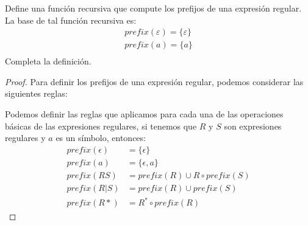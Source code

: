 \begin{Pro}
    Define una función recursiva que compute los prefijos de una expresión regular. La
    base de tal función recursiva es: 
    \begin{align*}
        prefix(\varepsilon) = \{\varepsilon\}\\
        prefix(a) = \{a\}\\ 
    \end{align*}
    Completa la definición. 
\end{Pro}

\begin{proof}
    \hspace{5mm}
    Para definir los prefijos de una expresión regular, podemos considerar las siguientes reglas:

    Podemos definir las reglas que aplicamos para cada una de las operaciones básicas de las expresiones regulares, 
    si tenemos que $R$ y $S$ son expresiones regulares y $a$ es un símbolo, entonces:
    \begin{align*}
        prefix(\epsilon) & = \{\epsilon\}\\
        prefix(a) & = \{\epsilon, a\}\\
        prefix(RS) & = prefix(R) \cup R \circ prefix(S)\\
        prefix(R|S) & = prefix(R) \cup prefix(S)\\
        prefix(R*) & = R^* \circ prefix(R)
    \end{align*}

\end{proof}
